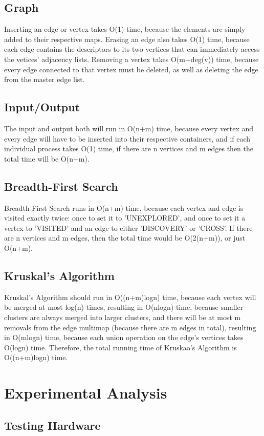 \documentclass[titlepage]{article}
\begin{document}
\begin{multicols}{2}
			\subsection{Graph}
                        Inserting an edge or vertex takes O(1) time, because the elements are simply added to their respective maps. Erasing an edge also takes O(1) time, because each edge contains the descriptors to its two vertices that can immediately access the vetices' adjacency lists. Removing a vertex takes O(m+deg(v)) time, because every edge connected to that vertex must be deleted, as well as deleting the edge from the master edge list.
			\subsection{Input/Output}
                        The input and output both will run in O(n+m) time, because every vertex and every edge will have to be inserted into their respective containers, and if each individual process takes O(1) time, if there are n vertices and m edges then the total time will be O(n+m).
			\subsection{Breadth-First Search}
                        Breadth-First Search runs in O(n+m) time, because each vertex and edge is visited exactly twice: once to set it to 'UNEXPLORED', and once to set it a vertex to 'VISITED' and an edge to either 'DISCOVERY' or 'CROSS'. If there are n vertices and m edges, then the total time would be O(2(n+m)), or just O(n+m).
			\subsection{Kruskal's Algorithm}
                         Kruskal's Algorithm should run in O((n+m)logn) time, because each vertex will be merged at most log(n) times, resulting in O(nlogn) time, because smaller clusters are always merged into larger clusters, and there will be at most m removals from the edge multimap (because there are m edges in total), resulting in O(mlogn) time, because each union operation on the edge's vertices takes O(logn) time. Therefore, the total running time of Kruskao's Algorithm is O((n+m)logn) time.
		\section{Experimental Analysis}
			\subsection{Testing Hardware}

\end{multicols}
\end{document}
